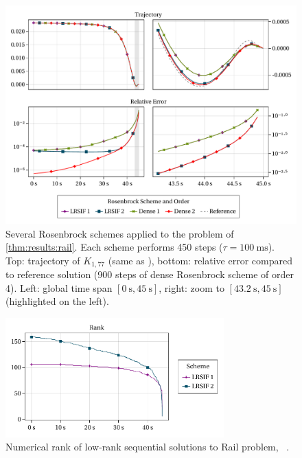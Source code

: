 \begin{figure}[t]
  \includegraphics[width=\textwidth]{figures/fig_results_sequential.pdf}
  \caption[Rosenbrock method applied to Rail problem]{%
    Several Rosenbrock schemes applied to the problem of \autoref{thm:results:rail}.
    Each scheme performs 450 steps ($\tau = \SI{100}{\milli\second}$).
    Top: trajectory of $K_{1,77}$ (same as \cite[Fig.~1]{Lang2015}),
    bottom: relative error compared to reference solution
    (900 steps of dense Rosenbrock scheme of order 4).
    Left: global time span $[\SI{0}{\second}, \SI{45}{\second}]$,
    right: zoom to $[\SI[round-mode=off]{43.2}{\second}, \SI{45}{\second}]$ (highlighted on the left).
  }
  \label{fig:results:sequential:rail}
\end{figure}

\begin{figure}[tp]
  \centering
  \includegraphics[width=0.75\textwidth]{figures/fig_results_sequential_rank.pdf}
  \caption[Numerical rank of low-rank sequential solutions to Rail problem]{%
    Numerical rank of low-rank sequential solutions to Rail problem,
    \cf~\cite[Figure~6.6b]{Lang2017}.
  }
\end{figure}

